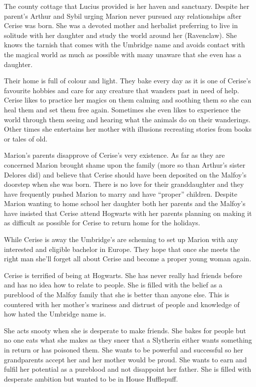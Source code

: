 \documentclass[9pt,twocolumn]{article}
\begin{document}
{The county cottage\comma{} that Lucius provided\comma{} is her haven and sanctuary. Despite her parent’s\comma{} Arthur and Sybil\comma{} urging\comma{} Marion never pursued any relationships after Cerise was born. She was a devoted mother and herbalist\comma{} preferring to live in solitude with her daughter and study the world around her (Ravenclaw). She knows the tarnish that comes with the Umbridge name\comma{} and avoids contact with the magical world as much as possible\comma{} with many unaware that she even has a daughter.

Their home is full of colour and light. They bake every day as it is one of Cerise’s favourite hobbies\comma{} and care for any creature that wanders past in need of help. Cerise likes to practice her magics on them\comma{} calming and soothing them so she can heal them and set them free again. Sometimes she even likes to experience the world through them\comma{} seeing and hearing what the animals do on their wanderings. Other times\comma{} she entertains her mother with illusions\comma{} recreating stories from books or tales of old.

Marion’s parents disapprove of Cerise’s very existence. As far as they are concerned\comma{} Marion brought shame upon the family (more so than Arthur’s sister Delores did) and believe that Cerise should have been deposited on the Malfoy’s doorstep when she was born. There is no love for their granddaughter and they have frequently pushed Marion to marry and have “proper” children. Despite Marion wanting to home school her daughter\comma{} both her parents and the Malfoy’s have insisted that Cerise attend Hogwarts\comma{} with her parents planning on making it as difficult as possible for Cerise to return home for the holidays.

While Cerise is away\comma{} the Umbridge’s are scheming to set up Marion with any interested and eligible bachelor in Europe. They hope that once she meets the right man\comma{} she’ll forget all about Cerise and become a proper young woman again.

Cerise is terrified of being at Hogwarts. She has never really had friends before\comma{} and has no idea how to relate to people. She is filled with the belief\comma{} as a pureblood of the Malfoy family\comma{} that she is better than anyone else. This is countered with her mother’s wariness and distrust of people\comma{} and knowledge of how hated the Umbridge name is. 

She acts snooty when she is desperate to make friends. She bakes for people\comma{} but no one eats what she makes as they sneer that a Slytherin either wants something in return or has poisoned them. She wants to be powerful and successful\comma{} so her grandparents accept her and her mother would be proud. She wants to earn and fulfil her potential as a pureblood and not disappoint her father. She is filled with desperate ambition\comma{} but wanted to be in House Hufflepuff. 

}
\end{document}

